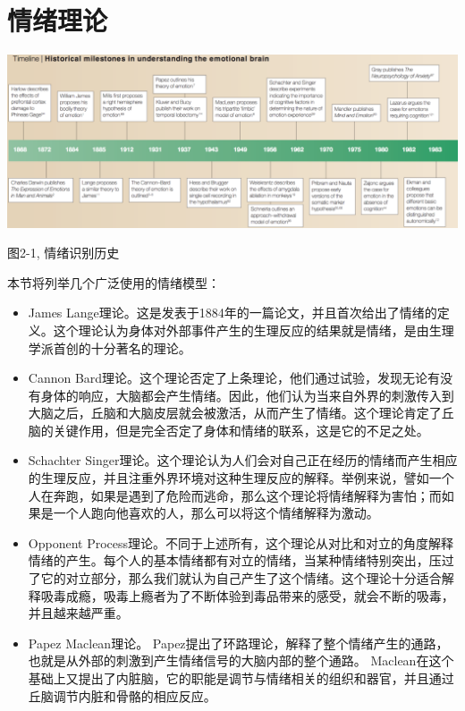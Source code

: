 \section{情绪理论}
	\centerline{\includegraphics[width=6in]{figure/timeline.png}}
	\centerline{图2-1, 情绪识别历史}
	本节将列举几个广泛使用的情绪模型：
	\begin{itemize}
		\item James Lange理论。这是发表于1884年的一篇论文，并且首次给出了情绪的定义。这个理论认为身体对外部事件产生的生理反应的结果就是情绪，是由生理学派首创的十分著名的理论。
		\item Cannon Bard理论。这个理论否定了上条理论，他们通过试验，发现无论有没有身体的响应，大脑都会产生情绪。因此，他们认为当来自外界的刺激传入到大脑之后，丘脑和大脑皮层就会被激活，从而产生了情绪。这个理论肯定了丘脑的关键作用，但是完全否定了身体和情绪的联系，这是它的不足之处。
		\item Schachter Singer理论。这个理论认为人们会对自己正在经历的情绪而产生相应的生理反应，并且注重外界环境对这种生理反应的解释。举例来说，譬如一个人在奔跑，如果是遇到了危险而逃命，那么这个理论将情绪解释为害怕；而如果是一个人跑向他喜欢的人，那么可以将这个情绪解释为激动。
		\item Opponent Process理论。不同于上述所有，这个理论从对比和对立的角度解释情绪的产生。每个人的基本情绪都有对立的情绪，当某种情绪特别突出，压过了它的对立部分，那么我们就认为自己产生了这个情绪。这个理论十分适合解释吸毒成瘾，吸毒上瘾者为了不断体验到毒品带来的感受，就会不断的吸毒，并且越来越严重。
		\item Papez Maclean理论。 Papez提出了环路理论，解释了整个情绪产生的通路，也就是从外部的刺激到产生情绪信号的大脑内部的整个通路。 Maclean在这个基础上又提出了内脏脑，它的职能是调节与情绪相关的组织和器官，并且通过丘脑调节内脏和骨骼的相应反应。
	\end{itemize}

